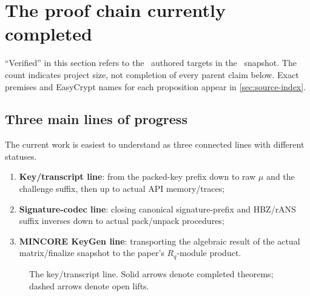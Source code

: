 \section{The proof chain currently completed}
\label{sec:proved-spine}

“Verified” in this section refers to the \AuthoredTargetCount\ authored targets
in the \SnapshotDate\ snapshot. The count indicates project size, not completion
of every parent claim below. Exact premises and EasyCrypt names for each
proposition appear in \cref{sec:source-index}.

\subsection{Three main lines of progress}

The current work is easiest to understand as three connected lines with different
statuses.

\begin{enumerate}
  \item \textbf{Key/transcript line}: from the packed-key prefix down to raw
        \(\mu\) and the challenge suffix, then up to actual API memory/traces;
  \item \textbf{Signature-codec line}: closing canonical signature-prefix and
        HBZ/rANS suffix inverses down to actual pack/unpack procedures;
  \item \textbf{MINCORE KeyGen line}: transporting the algebraic result of the
        actual matrix/finalize snapshot to the paper's \(R_q\)-module product.
\end{enumerate}

\begin{figure}[ht]
\centering
{}
\caption{The key/transcript line. Solid arrows denote completed theorems;
dashed arrows denote open lifts.}
\label{fig:key-transcript-spine}
\end{figure}

